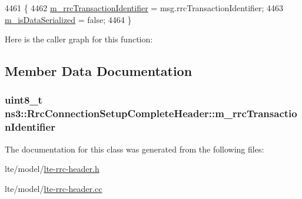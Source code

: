\begin{DoxyCode}
4461 \{
4462   \hyperlink{classns3_1_1RrcConnectionSetupCompleteHeader_a70eee3bfe3e825bec136553599c32b0d}{m\_rrcTransactionIdentifier} = msg.rrcTransactionIdentifier;
4463   \hyperlink{classns3_1_1Asn1Header_ae39d42f09e8ec85d8180843625fc92ba}{m\_isDataSerialized} = \textcolor{keyword}{false};
4464 \}
\end{DoxyCode}


Here is the caller graph for this function\+:




\subsection{Member Data Documentation}
\subsubsection[{\texorpdfstring{m\+\_\+rrc\+Transaction\+Identifier}{m_rrcTransactionIdentifier}}]{\setlength{\rightskip}{0pt plus 5cm}uint8\+\_\+t ns3\+::\+Rrc\+Connection\+Setup\+Complete\+Header\+::m\+\_\+rrc\+Transaction\+Identifier\hspace{0.3cm}{\ttfamily [private]}}\hypertarget{classns3_1_1RrcConnectionSetupCompleteHeader_a70eee3bfe3e825bec136553599c32b0d}{}\label{classns3_1_1RrcConnectionSetupCompleteHeader_a70eee3bfe3e825bec136553599c32b0d}


The documentation for this class was generated from the following files\+:\begin{DoxyCompactItemize}
\item 
lte/model/\hyperlink{lte-rrc-header_8h}{lte-\/rrc-\/header.\+h}\item 
lte/model/\hyperlink{lte-rrc-header_8cc}{lte-\/rrc-\/header.\+cc}\end{DoxyCompactItemize}
